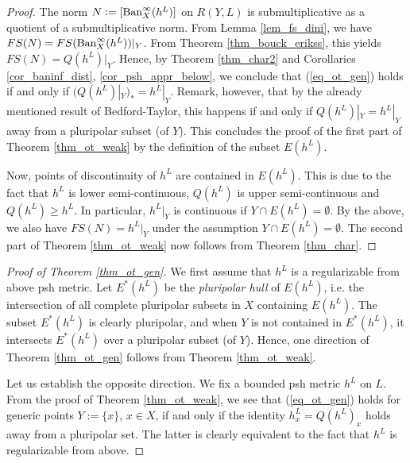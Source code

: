 \documentclass[12pt]{article}
\numberwithin{equation}{section}
\theoremstyle{theorem}
\theoremstyle{definition}
\theoremstyle{remark}
\begin{document}
	\begin{sloppypar}
	\begin{proof}
		The norm $N := [{\rm{Ban}}^{\infty}_{X}(h^L)]$ on $R(Y, L)$ is submultiplicative as a quotient of a submultiplicative norm.
		From Lemma \ref{lem_fs_dini}, we have $FS(N) = FS({\rm{Ban}}^{\infty}_{X}(h^L))|_Y$.
		From Theorem \ref{thm_bouck_erikss}, this yields $FS(N)  = Q(h^L)|_Y$.
		Hence, by Theorem \ref{thm_char2} and Corollaries \ref{cor_baninf_dist}, \ref{cor_psh_appr_below}, we conclude that  (\ref{eq_ot_gen}) holds if and only if $(Q(h^L)|_Y)_* = h^L|_Y$.
		Remark, however, that by the already mentioned result \cite[Theorem 7.1]{BedfordTaylor} of Bedford-Taylor, this happens if and only if $Q(h^L)|_Y = h^L|_Y$ away from a pluripolar subset (of $Y$).
		This concludes the proof of the first part of Theorem \ref{thm_ot_weak} by the definition of the subset $E(h^L)$.
		\par 
		Now, points of discontinuity of $h^L$ are contained in $E(h^L)$.
		This is due to the fact that $h^L$ is lower semi-continuous, $Q(h^L)$ is upper semi-continuous and $Q(h^L) \geq h^L$.
		In particular, $h^L|_Y$ is continuous if $Y \cap E(h^L) = \emptyset$.
		By the above, we also have $FS(N)  = h^L|_Y$ under the assumption $Y \cap E(h^L) = \emptyset$.
		The second part of Theorem \ref{thm_ot_weak} now follows from Theorem \ref{thm_char}.
	\end{proof}
	\end{sloppypar}
	\begin{proof}[Proof of Theorem \ref{thm_ot_gen}]
		We first assume that $h^L$ is a regularizable from above psh metric.
		 Let $E^*(h^L)$ be the \textit{pluripolar hull} of $E(h^L)$, i.e. the intersection of all complete pluripolar subsets in $X$ containing $E(h^L)$.
		The subset $E^*(h^L)$ is clearly pluripolar, and when $Y$ is not contained in $E^*(h^L)$, it intersects $E^*(h^L)$ over a pluripolar subset (of $Y$).
		Hence, one direction of Theorem \ref{thm_ot_gen} follows from Theorem \ref{thm_ot_weak}.
		\par 
		Let us establish the opposite direction.
		We fix a bounded psh metric $h^L$ on $L$.
		From the proof of Theorem \ref{thm_ot_weak}, we see that (\ref{eq_ot_gen}) holds for generic points $Y := \{ x \}$, $x \in X$, if and only if the identity $h^L_x = Q(h^L)_x$ holds away from a pluripolar set.
		The latter is clearly equivalent to the fact that $h^L$ is regularizable from above.
	\end{proof}
	
\end{document}
